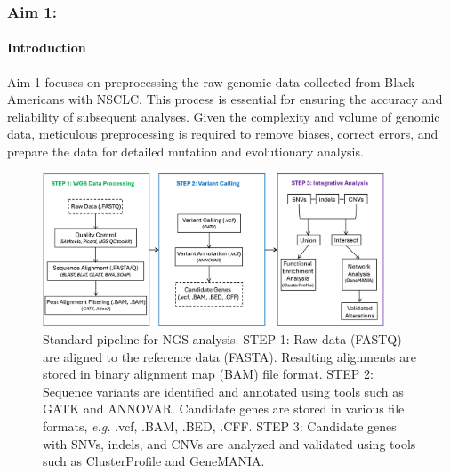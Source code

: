 

\subsubsection{Aim 1: \SpecificAimOne}

\paragraph{Introduction}

Aim 1 focuses on preprocessing the raw genomic data collected from Black Americans with NSCLC. 
This process is essential for ensuring the accuracy and reliability of subsequent analyses. 
Given the complexity and volume of genomic data, meticulous preprocessing is required to remove biases, correct errors, 
and prepare the data for detailed mutation and evolutionary analysis. 

\begin{figure}
  \centering
  \begin{mdframed}
  \includegraphics[width=4.0in]{./Figures/data-processing.png}
  \caption{Standard pipeline for NGS analysis.
  STEP 1: Raw data (FASTQ) are aligned to the reference data (FASTA). Resulting alignments are stored in binary alignment map (BAM) file format. 
  STEP 2: Sequence variants are identified and annotated using tools such as GATK and ANNOVAR. Candidate genes are stored in various file formats, \textit{e.g.} .vcf, .BAM, .BED, .CFF.
  STEP 3: Candidate genes with SNVs, indels, and CNVs are analyzed and validated using tools such as ClusterProfile and GeneMANIA.
  }
  \label{data-processing}
  \end{mdframed}
\end{figure}

